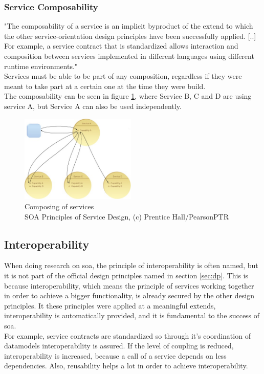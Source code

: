 \documentclass[12pt]{article}
\begin{document}
\subsubsection{Service Composability} 
"The composability of a service is an implicit byproduct of the extend to which the other service-orientation design principles have been successfully applied. [..] For example, a service contract that is standardized allows interaction and composition between services implemented in different languages using different runtime environments."\cite[page 189]{grau}\\
Services must be able to be part of any composition, regardless if they were meant to take part at a certain one at the time they were build. \cite[page 89]{te} \\
The composability can be seen in figure \ref{fig:composserv}, where Service B, C and D are using service A, but Service A can also be used independently.

\begin{figure}[here!]
	\centering
	\includegraphics[width=0.49\textwidth]{images/serivceorientationdotcom}
	\caption{Composing of services \cite{photos} \\ SOA Principles of Service Design, (c) Prentice Hall/PearsonPTR}
	\label{fig:composserv}
	\end{figure}
\FloatBarrier
 \noindent
\subsection{Interoperability}
When doing research on \gls{soa}, the principle of interoperability is often named, but it is not part of the official design principles named in section \ref{sec:dp}. This is because interoperability, which means the principle of services working together in order to achieve a bigger functionality, is already secured by the other design principles. It these principles were applied at a meaningful extends, interoperability is automatically provided, and it is fundamental to the success of \gls{soa}.\\
For example, service contracts are standardized so through it's coordination of datamodels interoperability is assured. If the level of coupling is reduced, interoperability is increased, because a call of a service depends on less dependencies. Also, reusability helps a lot in order to achieve interoperability. \cite[page 89-90]{te}
\newpage
\end{document}
